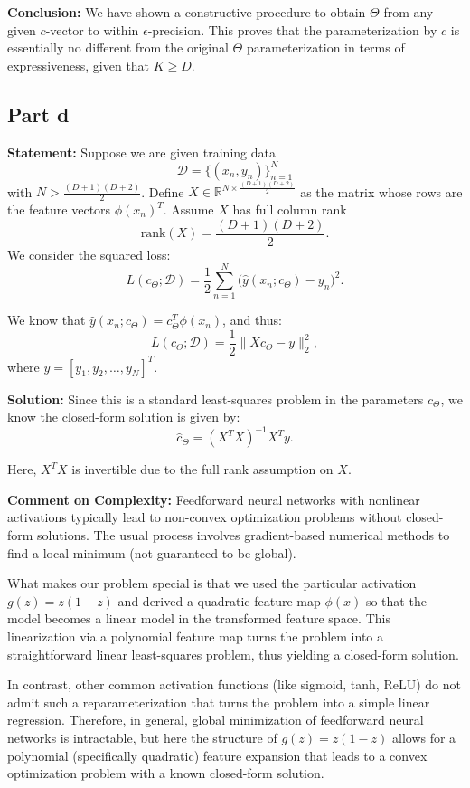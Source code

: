 \medskip

\noindent \textbf{Conclusion:}
We have shown a constructive procedure to obtain $\Theta$ from any given $c$-vector to within $\epsilon$-precision. This proves that the parameterization by $c$ is essentially no different from the original $\Theta$ parameterization in terms of expressiveness, given that $K \geq D$.

\subsection{Part d}

\noindent \textbf{Statement:} Suppose we are given training data 
\[
\mathcal{D} = \{(x_n,y_n)\}_{n=1}^N
\]
with $N > \frac{(D+1)(D+2)}{2}$. Define $X \in \mathbb{R}^{N \times \frac{(D+1)(D+2)}{2}}$ as the matrix whose rows are the feature vectors $\phi(x_n)^T$. Assume $X$ has full column rank 
\[
\text{rank}(X) = \frac{(D+1)(D+2)}{2}.
\]
We consider the squared loss:
\[
L(c_{\Theta}; \mathcal{D}) = \frac{1}{2} \sum_{n=1}^N \bigl(\hat{y}(x_n;c_{\Theta}) - y_n\bigr)^2.
\]

We know that $\hat{y}(x_n; c_{\Theta}) = c_{\Theta}^T \phi(x_n)$, and thus:
\[
L(c_{\Theta}; \mathcal{D}) = \frac{1}{2} \| X c_{\Theta} - y \|_2^2,
\]
where $y = [y_1, y_2, \ldots, y_N]^T$.

\medskip

\noindent \textbf{Solution:}
Since this is a standard least-squares problem in the parameters $c_{\Theta}$, we know the closed-form solution is given by:
\[
\hat{c}_{\Theta} = (X^T X)^{-1} X^T y.
\]

Here, $X^T X$ is invertible due to the full rank assumption on $X$.

\medskip

\noindent \textbf{Comment on Complexity:}
Feedforward neural networks with nonlinear activations typically lead to non-convex optimization problems without closed-form solutions. The usual process involves gradient-based numerical methods to find a local minimum (not guaranteed to be global).

What makes our problem special is that we used the particular activation $g(z)=z(1-z)$ and derived a quadratic feature map $\phi(x)$ so that the model becomes a linear model in the transformed feature space. This linearization via a polynomial feature map turns the problem into a straightforward linear least-squares problem, thus yielding a closed-form solution.

In contrast, other common activation functions (like sigmoid, tanh, ReLU) do not admit such a reparameterization that turns the problem into a simple linear regression. Therefore, in general, global minimization of feedforward neural networks is intractable, but here the structure of $g(z)=z(1-z)$ allows for a polynomial (specifically quadratic) feature expansion that leads to a convex optimization problem with a known closed-form solution.